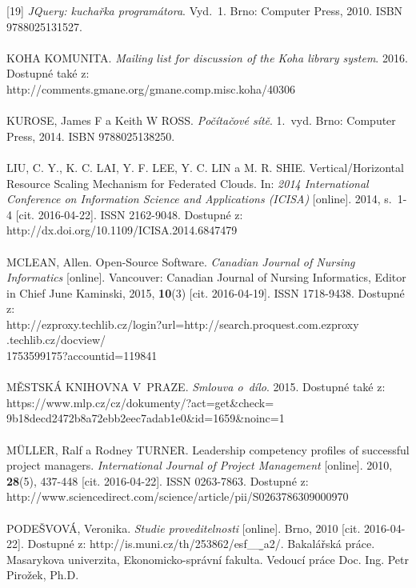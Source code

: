 \documentclass[
	11pt, oneside, printed, final, palatino, monochrome
	microtype,
	table,   %
	lof,     %
	lot     %
]{fithesis3}
\begin{document}
{[19] \textit{JQuery: kuchařka programátora}. Vyd.~1. Brno: Computer Press, 2010. ISBN 9788025131527.
~\\ ~\\ \noindent
[20] KOHA KOMUNITA. \textit{Mailing list for discussion of the Koha library system}. 2016. Dostupné také z: \\http://comments.gmane.org/gmane.comp.misc.koha/40306
~\\ ~\\ \noindent
[21] KUROSE, James F a Keith W ROSS. \textit{Počítačové sítě}. 1.~vyd. Brno: Computer Press, 2014. ISBN 9788025138250.
~\\ ~\\ \noindent
[22] LIU, C. Y., K. C. LAI, Y. F. LEE, Y. C. LIN a M. R. SHIE. Vertical/Horizontal Resource Scaling Mechanism for Federated Clouds. In: \textit{2014 International Conference on Information Science and Applications (ICISA)} [online]. 2014, s.~1-4 [cit. 2016-04-22]. ISSN 2162-9048. Dostupné z: \\http://dx.doi.org/10.1109/ICISA.2014.6847479
~\\ ~\\ \noindent
[23] MCLEAN, Allen. Open-Source Software. \textit{Canadian Journal of Nursing Informatics} [online]. Vancouver: Canadian Journal of Nursing Informatics, Editor in Chief June Kaminski, 2015, \textbf{10}(3) [cit. 2016-04-19]. ISSN 1718-9438. Dostupné z:\\ http://ezproxy.techlib.cz/login?url=http://search.proquest.com.ezproxy\\.techlib.cz/docview/\\1753599175?accountid=119841
~\\ ~\\ \noindent
[24] MĚSTSKÁ KNIHOVNA V~PRAZE. \textit{Smlouva o~dílo}. 2015. Dostupné také z:\\ https://www.mlp.cz/cz/dokumenty/?act=get\&check=\\9b18decd2472b8a72ebb2eec7adab1e0\&id=1659\&noinc=1
~\\ ~\\ \noindent
[25] MÜLLER, Ralf a Rodney TURNER. Leadership competency profiles of successful project managers. \textit{International Journal of Project Management} [online]. 2010, 	\textbf{28}(5), 437-448 [cit. 2016-04-22]. ISSN 0263-7863. Dostupné z: http://www.sciencedirect.com/science/article/pii/S0263786309000970
~\\ ~\\ \noindent
[26] PODEŠVOVÁ, Veronika. \textit{Studie proveditelnosti} [online]. Brno, 2010 [cit. 2016-04-22]. Dostupné z: http://is.muni.cz/th/253862/esf\_\b\_a2/. Bakalářská práce. Masarykova univerzita, Ekonomicko-správní fakulta. Vedoucí práce Doc. Ing. Petr Pirožek, Ph.D.
}
\end{document}
